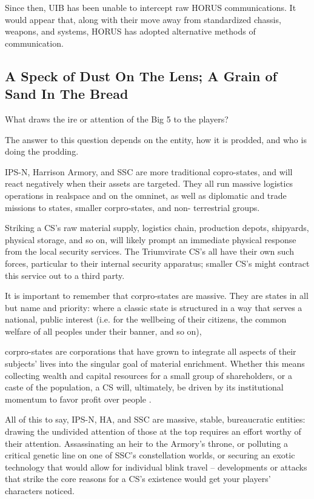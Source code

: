 Since then, UIB has been unable to intercept raw HORUS communications. It would appear
that, along with their move away from standardized chassis, weapons, and systems, HORUS
has adopted alternative methods of communication.

\subsection{A Speck of Dust On The Lens; A Grain of Sand In The Bread}

What draws the ire or attention of the Big 5 to the players?

The answer to this question depends on the entity, how it is prodded, and who is doing the
prodding.

IPS-N, Harrison Armory, and SSC are more traditional copro-states, and will react negatively
when their assets are targeted. They all run massive logistics operations in realspace and on the
omninet, as well as diplomatic and trade missions to states, smaller corpro-states, and non-
terrestrial groups.

Striking a CS's raw material supply, logistics chain, production depots, shipyards, physical
storage, and so on, will likely prompt an immediate physical response from the local security
services. The Triumvirate CS's all have their own such forces, particular to their internal security
apparatus; smaller CS's might contract this service out to a third party.

It is important to remember that corpro-states are massive. They are states in all but name and
priority: where a classic state is structured in a way that serves a national, public interest (i.e. for
the wellbeing of their citizens, the common welfare of all peoples under their banner, and so on),




corpro-states are corporations that have grown to integrate all aspects of their subjects' lives into
the singular goal of material enrichment. Whether this means collecting wealth and capital
resources for a small group of shareholders, or a caste of the population, a CS will, ultimately, be
driven by its institutional momentum to favor profit over people .

All of this to say, IPS-N, HA, and SSC are massive, stable, bureaucratic entities: drawing the
undivided attention of those at the top requires an effort worthy of their attention. Assassinating an
heir to the Armory's throne, or polluting a critical genetic line on one of SSC's constellation worlds,
or securing an exotic technology that would allow for individual blink travel -- developments or
attacks that strike the core reasons for a CS's existence would get your players' characters
noticed.

